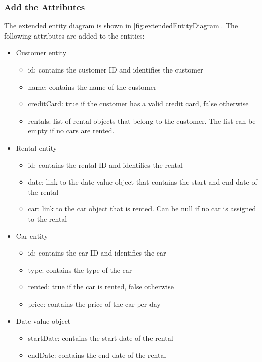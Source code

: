 \subsubsection*{Add the Attributes}
The extended entity diagram is shown in \autoref{fig:extendedEntityDiagram}.
The following attributes are added to the entities:
\begin{itemize}
    \item Customer entity
    \begin{itemize}
        \item id: contains the customer ID and identifies the customer
        \item name: contains the name of the customer
        \item creditCard: true if the customer has a valid credit card, false otherwise
        \item rentals: list of rental objects that belong to the customer. The list can be empty if no cars are rented.
    \end{itemize}
    \item Rental entity
    \begin{itemize}
        \item id: contains the rental ID and identifies the rental
        \item date: link to the date value object that contains the start and end date of the rental
        \item car: link to the car object that is rented. Can be null if no car is assigned to the rental
    \end{itemize}
    \item Car entity
    \begin{itemize}
        \item id: contains the car ID and identifies the car
        \item type: contains the type of the car
        \item rented: true if the car is rented, false otherwise
        \item price: contains the price of the car per day
    \end{itemize}
    \item Date value object
    \begin{itemize}
        \item startDate: contains the start date of the rental
        \item endDate: contains the end date of the rental
    \end{itemize}
\end{itemize}

